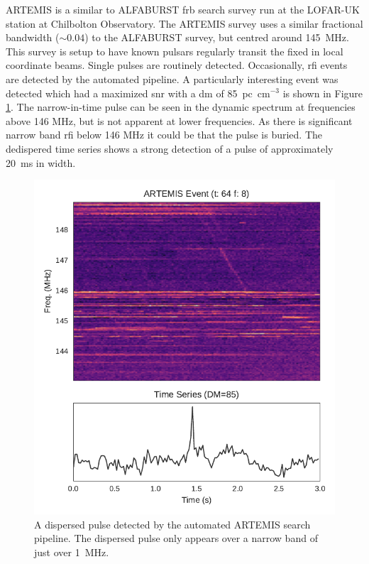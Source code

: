 \documentclass[a4paper,fleqn,usenatbib]{mnras}
\begin{document}
ARTEMIS \citep{2015MNRAS.452.1254K} is a similar to ALFABURST \gls{frb} search
survey run at the LOFAR-UK station at Chilbolton Observatory. The ARTEMIS survey
uses a similar fractional bandwidth ($\sim 0.04$) to the ALFABURST survey, but
centred around 145~MHz. This survey is setup to have known pulsars regularly
transit the fixed in local coordinate beams. Single pulses are routinely
detected. Occasionally, \gls{rfi} events are detected by the automated pipeline.
A particularly interesting event was detected which had a maximized \gls{snr}
with a \gls{dm} of 85~pc~cm$^{-3}$ is shown in Figure \ref{fig:lofar_dynamic}.
The narrow-in-time pulse can be seen in the dynamic spectrum at frequencies
above 146 MHz, but is not apparent at lower frequencies. As there is significant
narrow band \gls{rfi} below 146 MHz it could be that the pulse is buried. The
dedispered time series shows a strong detection of a pulse of approximately
20~ms in width.

\begin{figure}
    \includegraphics[width=1.0\linewidth]{figures/LOFAR_dynamic.pdf}
    \caption{A dispersed pulse detected by the automated ARTEMIS search
    pipeline. The dispersed pulse only appears over a narrow band of just over
    1~MHz.
    }
    \label{fig:lofar_dynamic}
\end{figure}
\end{document}
